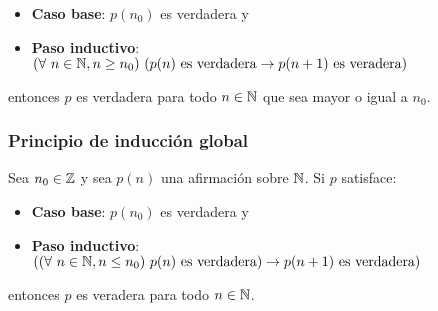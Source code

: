 \begin{itemize}
    \item \textbf{Caso base}: $p(n_0)$ es verdadera y
    \item \textbf{Paso inductivo}: $(\forall~n\in\mathbb{N}, n\geq n_0)~(p(n) \text{ es verdadera}\to p(n+1) \text{ es veradera})$
\end{itemize}
entonces $p$ es verdadera para todo $n\in\mathbb{N}$ que sea mayor o igual a $n_0$.

\subsubsection{Principio de inducción global}
Sea $n_0\in\mathbb{Z}$ y sea $p(n)$ una afirmación sobre $\mathbb{N}$. Si $p$ satisface:

\begin{itemize}
    \item \textbf{Caso base}: $p(n_0)$ es verdadera y
    \item \textbf{Paso inductivo}: $((\forall~n\in\mathbb{N}, n\leq n_0)~p(n) \text{ es verdadera})\to p(n+1) \text{ es verdadera})$
\end{itemize}
entonces $p$ es veradera para todo $n\in\mathbb{N}$.


